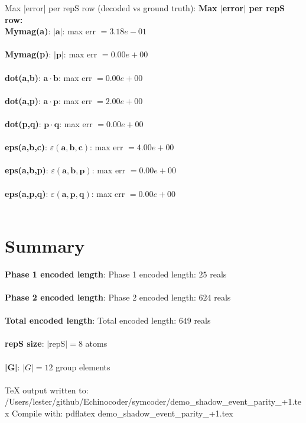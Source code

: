 \documentclass[a4paper,11pt]{article}
\newcommand{\vc}[1]{\ensuremath{\mathbf{#1}}}
\newcommand{\dnfagmiihhiejm}[1]{|\vc{#1}|}
\newcommand{\pdcegfomjfhook}[2]{\mathbf{#1} \cdot \mathbf{#2}}
\newcommand{\kblbmcpggoncpf}[3]{\varepsilon(\mathbf{#1},\mathbf{#2},\mathbf{#3})}
\begin{document}
  Max |error| per repS row (decoded vs ground truth):
\textbf{Max $|$error$|$ per repS row:}\\
\textbf{    Mymag(a)}: $\dnfagmiihhiejm{a}$: max err $= 3.18e-01$\\\\
\textbf{    Mymag(p)}: $\dnfagmiihhiejm{p}$: max err $= 0.00e+00$\\\\
\textbf{    dot(a,b)}: $\pdcegfomjfhook{a}{b}$: max err $= 0.00e+00$\\\\
\textbf{    dot(a,p)}: $\pdcegfomjfhook{a}{p}$: max err $= 2.00e+00$\\\\
\textbf{    dot(p,q)}: $\pdcegfomjfhook{p}{q}$: max err $= 0.00e+00$\\\\
\textbf{    eps(a,b,c)}: $\kblbmcpggoncpf{a}{b}{c}$: max err $= 4.00e+00$\\\\
\textbf{    eps(a,b,p)}: $\kblbmcpggoncpf{a}{b}{p}$: max err $= 0.00e+00$\\\\
\textbf{    eps(a,p,q)}: $\kblbmcpggoncpf{a}{p}{q}$: max err $= 0.00e+00$\\\\

\section{Summary}
\textbf{  Phase 1 encoded length}: Phase 1 encoded length: $25$ reals\\\\
\textbf{  Phase 2 encoded length}: Phase 2 encoded length: $624$ reals\\\\
\textbf{  Total encoded length}: Total encoded length: $649$ reals\\\\
\textbf{  repS size}: $|\text{repS}| = 8$ atoms\\\\
\textbf{  |G|}: $|G| = 12$ group elements\\\\

  TeX output written to: /Users/lester/github/Echinocoder/symcoder/demo\_shadow\_event\_parity\_+1.tex
  Compile with:  pdflatex demo\_shadow\_event\_parity\_+1.tex
\end{document}
